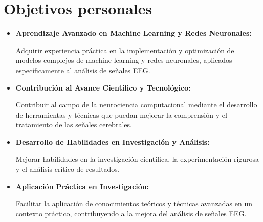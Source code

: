 \section{Objetivos  personales}


\begin{itemize}

\item
\textbf{Aprendizaje Avanzado en Machine Learning y Redes Neuronales:}

Adquirir experiencia práctica en la implementación y optimización de modelos complejos de machine learning y redes neuronales, aplicados específicamente al análisis de señales EEG.


\item
\textbf{Contribución al Avance Científico y Tecnológico:}

Contribuir al campo de la neurociencia computacional mediante el desarrollo de herramientas y técnicas que puedan mejorar la comprensión y el tratamiento de las señales cerebrales.


\item
\textbf{Desarrollo de Habilidades en Investigación y Análisis:}

Mejorar habilidades en la investigación científica, la experimentación rigurosa y el análisis crítico de resultados.


\item
\textbf{Aplicación Práctica en Investigación:}

Facilitar la aplicación de conocimientos teóricos y técnicas avanzadas en un contexto práctico, contribuyendo a la mejora del análisis de señales EEG.

\end{itemize}



